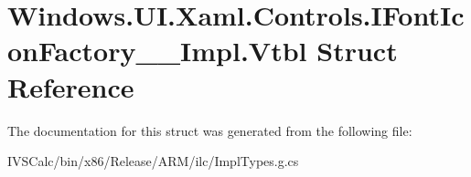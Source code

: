 \hypertarget{struct_windows_1_1_u_i_1_1_xaml_1_1_controls_1_1_i_font_icon_factory_____impl_1_1_vtbl}{}\section{Windows.\+U\+I.\+Xaml.\+Controls.\+I\+Font\+Icon\+Factory\+\_\+\+\_\+\+Impl.\+Vtbl Struct Reference}
\label{struct_windows_1_1_u_i_1_1_xaml_1_1_controls_1_1_i_font_icon_factory_____impl_1_1_vtbl}


The documentation for this struct was generated from the following file\+:\begin{DoxyCompactItemize}
\item 
I\+V\+S\+Calc/bin/x86/\+Release/\+A\+R\+M/ilc/Impl\+Types.\+g.\+cs\end{DoxyCompactItemize}
